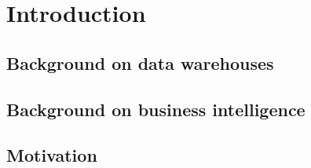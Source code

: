 \chapter{Introduction}
\label{chap:introduction}

\section{Background on data warehouses}

\section{Background on business intelligence}

\section{Motivation}

%

